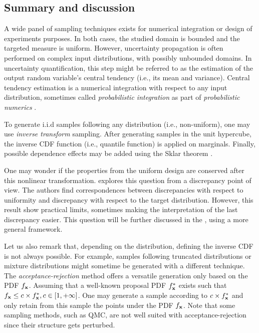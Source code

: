 \subsection{Summary and discussion}
A wide panel of sampling techniques exists for numerical integration or design of experiments purposes. 
In both cases, the studied domain is bounded and the targeted measure is uniform. 
However, uncertainty propagation is often performed on complex input distributions, with possibly unbounded domains. 
In uncertainty quantification, this step might be referred to as the estimation of the output random variable's central tendency (i.e., its mean and variance). 
Central tendency estimation is a numerical integration with respect to any input distribution, sometimes called \textit{probabilistic integration} \citep{briol_oates_2019} as part of \textit{probabilistic numerics} \citep{oates_sullivan_2019}.  

To generate i.i.d samples following any distribution (i.e., non-uniform), one may use \textit{inverse transform} sampling. 
After generating samples in the unit hypercube, the inverse CDF function (i.e., quantile function) is applied on marginals. 
Finally, possible dependence effects may be added using the Sklar theorem .

One may wonder if the properties from the uniform design are conserved after this nonlinear transformation. 
\citet{hickernell_2020} explores this question from a discrepancy point of view. 
The authors find correspondences between discrepancies with respect to uniformity and discrepancy with respect to the target distribution. 
However, this result show practical limits, sometimes making the interpretation of the last discrepancy easier. 
This question will be further discussed in the , using a more general framework.

Let us also remark that, depending on the distribution, defining the inverse CDF is not always possible. 
For example, samples following truncated distributions or mixture distributions might sometime be generated with a different technique. 
The \textit{acceptance-rejection} method offers a versatile generation only based on the PDF $f_{{\bf x}}$. 
Assuming that a well-known proposal PDF $f^*_{{\bf x}}$ exists such that $f_{{\bf x}} \leq c \times f^*_{{\bf x}}, c \in [1, +\infty]$. 
One may generate a sample according to $c \times f^*_{{\bf x}}$ and only retain from this sample the points under the PDF $f_{{\bf x}}$. 
Note that some sampling methods, such as QMC, are not well suited with acceptance-rejection since their structure gets perturbed. 

